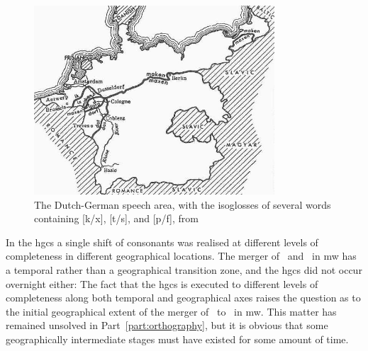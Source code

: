 \begin{figure}[h]
  \centering
  \includegraphics[width=0.8\textwidth]{3orth/images/hgcs.jpg}
  \caption[Bloomfield's isoglosses of the \acrshort{hgcs}.]{The Dutch-German speech area, with the isoglosses of several words containing [k/x], [t/s], and [p/f], from \textcite[344]{Blo_Language33}}
\label{fig:hgcsmap}
\end{figure}

In the \gls{hgcs} a single shift of consonants was realised at different levels of completeness in different geographical locations. The merger of \lT\ and \xD\ in \gls{mw} has a temporal rather than a geographical transition zone, and the \gls{hgcs} did not occur overnight either:
The fact that the \gls{hgcs} is executed to different levels of completeness along both temporal and geographical axes raises the question as to the initial geographical extent of the merger of \lT\ to \xD\ in \gls{mw}. This matter has remained unsolved in Part~\ref{part:orthography}, but it is obvious that some geographically intermediate stages must have existed for some amount of time.


